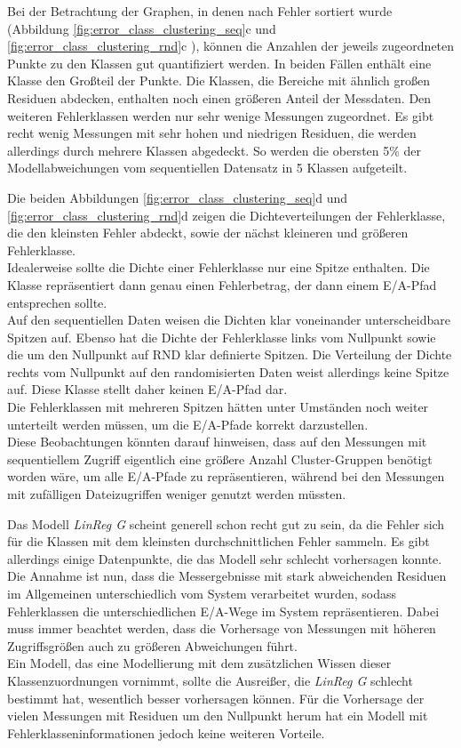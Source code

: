 \documentclass[
	12pt,
	a4paper,
	BCOR10mm,
	DIV14,
	listof=totoc,
	bibliography=totoc,
	headsepline
]{scrreprt}
\begin{document}
Bei der Betrachtung der Graphen, in denen nach Fehler sortiert wurde (Abbildung \ref{fig:error_class_clustering_seq}c und \ref{fig:error_class_clustering_rnd}c ), können die Anzahlen der jeweils zugeordneten Punkte zu den Klassen gut quantifiziert werden.
In beiden Fällen enthält eine Klasse den Großteil der Punkte.
Die Klassen, die Bereiche mit ähnlich großen Residuen abdecken, enthalten noch einen größeren Anteil der Messdaten. Den weiteren Fehlerklassen werden nur sehr wenige Messungen zugeordnet.
Es gibt recht wenig Messungen mit sehr hohen und niedrigen Residuen, die werden allerdings durch mehrere Klassen abgedeckt. So werden die obersten 5\% der Modellabweichungen vom sequentiellen Datensatz in 5 Klassen aufgeteilt.\medskip

Die beiden Abbildungen \ref{fig:error_class_clustering_seq}d und \ref{fig:error_class_clustering_rnd}d zeigen die Dichteverteilungen der Fehlerklasse, die den kleinsten Fehler abdeckt, sowie der nächst kleineren und größeren Fehlerklasse.\\
Idealerweise sollte die Dichte einer Fehlerklasse nur eine Spitze enthalten. Die Klasse repräsentiert dann genau einen Fehlerbetrag, der dann einem E/A-Pfad entsprechen sollte.\\
Auf den sequentiellen Daten weisen die Dichten klar voneinander unterscheidbare Spitzen auf.
Ebenso hat die Dichte der Fehlerklasse links vom Nullpunkt sowie die um den Nullpunkt auf RND klar definierte Spitzen. Die Verteilung der Dichte rechts vom Nullpunkt auf den randomisierten Daten weist allerdings keine Spitze auf. Diese Klasse stellt daher keinen E/A-Pfad dar.\\
Die Fehlerklassen mit mehreren Spitzen hätten unter Umständen noch weiter unterteilt werden müssen, um die E/A-Pfade korrekt darzustellen.\\
Diese Beobachtungen könnten darauf hinweisen, dass auf den Messungen mit sequentiellem Zugriff eigentlich eine größere Anzahl Cluster-Gruppen benötigt worden wäre, um alle E/A-Pfade zu repräsentieren, während bei den Messungen mit zufälligen Dateizugriffen weniger genutzt werden müssten. \medskip

Das Modell \textit{LinReg G} scheint generell schon recht gut zu sein, da die Fehler sich für die Klassen mit dem kleinsten durchschnittlichen Fehler sammeln.
Es gibt allerdings einige Datenpunkte, die das Modell sehr schlecht vorhersagen konnte. Die Annahme ist nun, dass die Messergebnisse mit stark abweichenden Residuen im Allgemeinen unterschiedlich vom System verarbeitet wurden, sodass Fehlerklassen die unterschiedlichen E/A-Wege im System repräsentieren. 
Dabei muss immer beachtet werden, dass die Vorhersage von Messungen mit höheren Zugriffsgrößen auch zu größeren Abweichungen führt.\\
Ein Modell, das eine Modellierung mit dem zusätzlichen Wissen dieser Klassenzuordnungen vornimmt, sollte die Ausreißer, die \textit{LinReg G} schlecht bestimmt hat, wesentlich besser vorhersagen können.
Für die Vorhersage der vielen Messungen mit Residuen um den Nullpunkt herum hat ein Modell mit Fehlerklasseninformationen jedoch keine weiteren Vorteile. 
\end{document}
